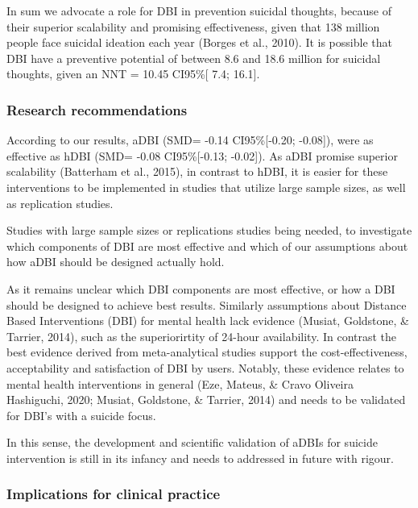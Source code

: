 \documentclass[
  english,
  man]{apa6}
\begin{document}
In sum we advocate a role for DBI in prevention suicidal thoughts, because of their superior scalability and promising effectiveness, given that 138 million people face suicidal ideation each year (Borges et al., 2010). It is possible that DBI have a preventive potential of between 8.6 and 18.6 million for suicidal thoughts, given an NNT = 10.45 CI95\%{[} 7.4; 16.1{]}.

\hypertarget{research-recommendations}{%
\subsubsection{Research recommendations}\label{research-recommendations}}

According to our results, aDBI (SMD= -0.14 CI95\%{[}-0.20; -0.08{]}), were as effective as hDBI (SMD= -0.08 CI95\%{[}-0.13; -0.02{]}). As aDBI promise superior scalability (Batterham et al., 2015), in contrast to hDBI, it is easier for these interventions to be implemented in studies that utilize large sample sizes, as well as replication studies.

Studies with large sample sizes or replications studies being needed, to investigate which components of DBI are most effective and which of our assumptions about how aDBI should be designed actually hold.

As it remains unclear which DBI components are most effective, or how a DBI should be designed to achieve best results. Similarly assumptions about Distance Based Interventions (DBI) for mental health lack evidence (Musiat, Goldstone, \& Tarrier, 2014), such as the superiorirtity of 24-hour availability. In contrast the best evidence derived from meta-analytical studies support the cost-effectiveness, acceptability and satisfaction of DBI by users. Notably, these evidence relates to mental health interventions in general (Eze, Mateus, \& Cravo Oliveira Hashiguchi, 2020; Musiat, Goldstone, \& Tarrier, 2014) and needs to be validated for DBI's with a suicide focus.

In this sense, the development and scientific validation of aDBIs for suicide intervention is still in its infancy and needs to addressed in future with rigour.

\hypertarget{implications-for-clinical-practice}{%
\subsubsection{Implications for clinical practice}\label{implications-for-clinical-practice}}
\end{document}
